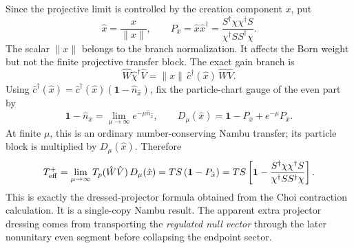 \documentclass[aps,prb,onecolumn,nofootinbib,superscriptaddress]{revtex4-2}
\newcommand{\I}{\mathbf{1}}
\theoremstyle{plain}
\theoremstyle{definition}
\begin{document}
Since the projective limit is controlled by the creation component \(x\), put
\begin{equation}
  \hat x=\frac{x}{\|x\|},
  \qquad
  P_{\hat x}=\hat x\hat x^\dagger
  =
  \frac{S^\dagger\chi\chi^\dagger S}{\chi^\dagger SS^\dagger\chi}.
  \label{eq:dressed-gain-projector-nambu}
\end{equation}
The scalar \(\|x\|\) belongs to the branch normalization.  It affects the
Born weight but not the finite projective transfer block.  The exact gain
branch is
\begin{equation}
  \hat W\hat\chi^\dagger\hat V
  =
  \|x\|\,
  \hat c^\dagger(\hat x)\,\hat W\hat V .
  \label{eq:gain-after-transport-projective-limit}
\end{equation}
Using
\(\hat c^\dagger(\hat x)=\hat c^\dagger(\hat x)(\I-\hat n_{\hat x})\), fix
the particle-chart gauge of the even part by
\begin{equation}
  \I-\hat n_{\hat x}
  =
  \lim_{\mu\to\infty}e^{-\mu\hat n_{\hat x}},
  \qquad
  D_\mu(\hat x)=\I-P_{\hat x}+e^{-\mu}P_{\hat x}.
  \label{eq:dressed-gain-empty-gauge}
\end{equation}
At finite \(\mu\), this is an ordinary number-conserving Nambu transfer; its
particle block is multiplied by \(D_\mu(\hat x)\).  Therefore
\begin{equation}
  T_{\rm eff}^{+}
  =
  \lim_{\mu\to\infty}
  T_p(\hat W\hat V)\,D_\mu(\hat x)
  =
  TS\left(\I-P_{\hat x}\right)
  =
  TS\left[
    \I-
    \frac{S^\dagger\chi\chi^\dagger S}
         {\chi^\dagger SS^\dagger\chi}
  \right].
  \label{eq:nambu-derived-dressed-gain-transfer}
\end{equation}
This is exactly the dressed-projector formula obtained from the Choi
contraction calculation.  It is a single-copy Nambu result.  The apparent
extra projector dressing comes from transporting the \emph{regulated null
vector} through the later nonunitary even segment before collapsing the
endpoint sector.
\end{document}
